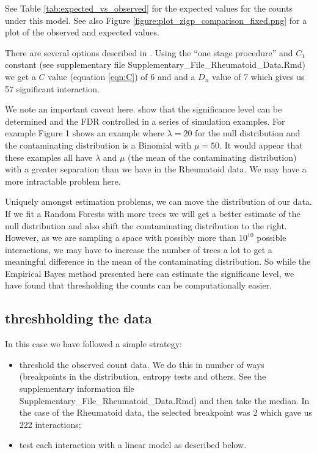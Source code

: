 \documentclass[preprint,12pt,3p]{elsarticle}
\begin{document}
See Table \ref{tab:expected_vs_observed} for the expected values for the counts under this model. See also Figure
\ref{figure:plot_zigp_comparison_fixed.png} for a plot of the observed and expected values.

There are several options described in  \cite{Gauran.et.al.2018}.
Using the ``one stage procedure'' and $C_1$ constant (see supplementary file Supplementary_File_Rheumatoid_Data.Rmd)
we get a $C$ value (equation \ref{eqn:C}) of 6 and and a $D_n$ value of 7 which gives us 57 significant interaction.

We note an important caveat here.  \cite{Gauran.et.al.2018} show that the significance level can be
determined and the FDR controlled in a series of simulation examples. For example  Figure 1 \cite[]{Gauran.et.al.2018}
shows an example where $\lambda =20$ for the null distribution and the contaminating distribution is a Binomial with
$\mu=50.$ It would appear that these examples all have $\lambda$ and $\mu$ (the mean of the contaminating distribution) with a
greater separation than we have in the Rheumatoid data. We may have a more intractable problem here.

Uniquely amongst estimation problems, we can move the distribution of our data. If we fit a Random Forests with more
trees we will get a better estimate of the null distribution and also shift the comtaminating distribution to the
right. However, as we are sampling a space with possibly more than $10^{10}$ possible interactions, we may have to increase the
number of trees a lot to get a meaningful difference in the mean of the contaminating distribution.
So while the Empirical Bayes method presented here can estimate the significane level, we have found that
thresholding the counts can be computationally easier. 

\subsection{threshholding the data}
In this case we have followed a simple strategy:
\begin{itemize}
\item threshold the observed count data. We do this in number of ways  (breakpoints in the distribution,
  entropy tests and others. See the supplementary information file Supplementary_File_Rheumatoid_Data.Rmd) and then take the median. In
  the case of the Rheumatoid data, the selected breakpoint was 2 which gave us 222 interactions;
\item test each interaction with a linear model as described below.
\end{itemize}
\end{document}
